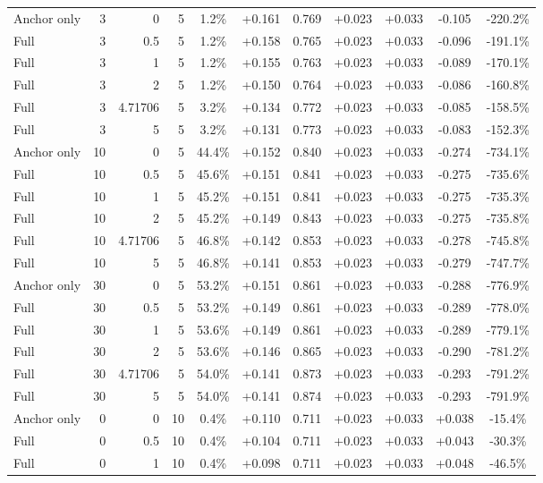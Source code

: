 \begin{table}[htbp]
\begin{tabular}{lrrrccccccc}
Anchor only & 3 & 0 & 5 & 1.2\% & +0.161 & 0.769 & +0.023 & +0.033 & -0.105 & -220.2\% \\
Full & 3 & 0.5 & 5 & 1.2\% & +0.158 & 0.765 & +0.023 & +0.033 & -0.096 & -191.1\% \\
Full & 3 & 1 & 5 & 1.2\% & +0.155 & 0.763 & +0.023 & +0.033 & -0.089 & -170.1\% \\
Full & 3 & 2 & 5 & 1.2\% & +0.150 & 0.764 & +0.023 & +0.033 & -0.086 & -160.8\% \\
Full & 3 & 4.71706 & 5 & 3.2\% & +0.134 & 0.772 & +0.023 & +0.033 & -0.085 & -158.5\% \\
Full & 3 & 5 & 5 & 3.2\% & +0.131 & 0.773 & +0.023 & +0.033 & -0.083 & -152.3\% \\
Anchor only & 10 & 0 & 5 & 44.4\% & +0.152 & 0.840 & +0.023 & +0.033 & -0.274 & -734.1\% \\
Full & 10 & 0.5 & 5 & 45.6\% & +0.151 & 0.841 & +0.023 & +0.033 & -0.275 & -735.6\% \\
Full & 10 & 1 & 5 & 45.2\% & +0.151 & 0.841 & +0.023 & +0.033 & -0.275 & -735.3\% \\
Full & 10 & 2 & 5 & 45.2\% & +0.149 & 0.843 & +0.023 & +0.033 & -0.275 & -735.8\% \\
Full & 10 & 4.71706 & 5 & 46.8\% & +0.142 & 0.853 & +0.023 & +0.033 & -0.278 & -745.8\% \\
Full & 10 & 5 & 5 & 46.8\% & +0.141 & 0.853 & +0.023 & +0.033 & -0.279 & -747.7\% \\
Anchor only & 30 & 0 & 5 & 53.2\% & +0.151 & 0.861 & +0.023 & +0.033 & -0.288 & -776.9\% \\
Full & 30 & 0.5 & 5 & 53.2\% & +0.149 & 0.861 & +0.023 & +0.033 & -0.289 & -778.0\% \\
Full & 30 & 1 & 5 & 53.6\% & +0.149 & 0.861 & +0.023 & +0.033 & -0.289 & -779.1\% \\
Full & 30 & 2 & 5 & 53.6\% & +0.146 & 0.865 & +0.023 & +0.033 & -0.290 & -781.2\% \\
Full & 30 & 4.71706 & 5 & 54.0\% & +0.141 & 0.873 & +0.023 & +0.033 & -0.293 & -791.2\% \\
Full & 30 & 5 & 5 & 54.0\% & +0.141 & 0.874 & +0.023 & +0.033 & -0.293 & -791.9\% \\
Anchor only & 0 & 0 & 10 & 0.4\% & +0.110 & 0.711 & +0.023 & +0.033 & +0.038 & -15.4\% \\
Full & 0 & 0.5 & 10 & 0.4\% & +0.104 & 0.711 & +0.023 & +0.033 & +0.043 & -30.3\% \\
Full & 0 & 1 & 10 & 0.4\% & +0.098 & 0.711 & +0.023 & +0.033 & +0.048 & -46.5\% \\

\end{tabular}
\end{table}
